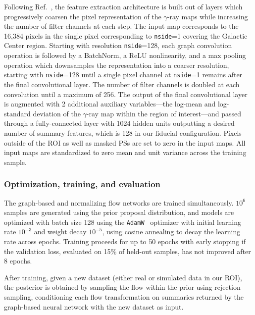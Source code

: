 \documentclass[prd,aps,10pt,nofootinbib,twocolumn,superscriptaddress,preprintnumbers,balancelastpage,longbibliography]{revtex4-1}
\begin{document}
Following Ref.~\cite{Perraudin:2018rbt}, the feature extraction architecture is built out of layers which progressively coarsen the pixel representation of the $\gamma$-ray maps while increasing the number of filter channels at each step. The input map corresponds to the 16,384 pixels in the single pixel corresponding to \texttt{nside}=1 covering the Galactic Center region. Starting with \HEALPix resolution \texttt{nside}=128, each graph convolution operation is followed by a BatchNorm, a ReLU nonlinearity, and a max pooling operation which downsamples the representation into a coarser resolution, starting with \texttt{nside}=128 until a single pixel channel at \texttt{nside}=1 remains after the final convolutional layer. The number of filter channels is doubled at each convolution until a maximum of 256. The output of the final convolutional layer is augmented with 2 additional auxiliary variables---the log-mean and log-standard deviation of the $\gamma$-ray map within the region of interest---and passed through a fully-connected layer with 1024 hidden units outputting a desired number of summary features, which is 128 in our fiducial configuration. Pixels outside of the ROI as well as masked PSs are set to zero in the input maps. All input maps are standardized to zero mean and unit variance across the training sample.

\subsubsection*{Optimization, training, and evaluation}

The graph-based and normalizing flow networks are trained simultaneously. $10^{6}$ samples are generated using the prior proposal distribution, and models are optimized with batch size 128 using the \texttt{AdamW}~\cite{KingmaB14,loshchilov2018decoupled} optimizer with initial learning rate $10^{-3}$ and weight decay $10^{-5}$, using cosine annealing to decay the learning rate across epochs. Training proceeds for up to 50 epochs with early stopping if the validation loss, evaluated on 15\% of held-out samples, has not improved after 8 epochs. 

After training, given a new dataset (either real or simulated \Fermi data in our ROI), the posterior is obtained by sampling the flow within the prior using rejection sampling, conditioning each flow transformation on summaries returned by the graph-based neural network with the new dataset as input.
\end{document}
